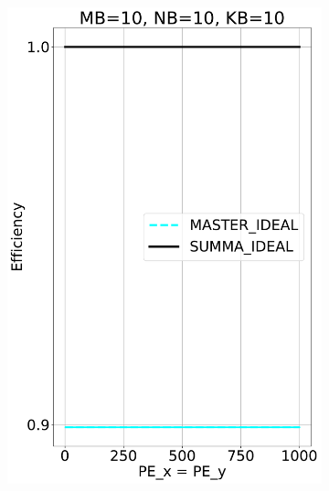 \begin{figure}[t!]
\begin{subfigure}{0.32\columnwidth}
    \includegraphics[width=\linewidth]{figures/efficiency_cost_ideal_10_10_10.pdf}
  \end{subfigure}
  \hfill
  \begin{subfigure}{0.32\columnwidth}

\end{subfigure}
\end{figure}
